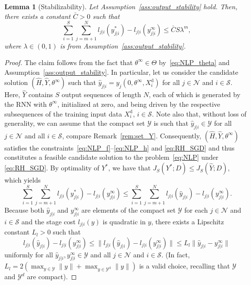 \documentclass{article} %
\newtheorem{lem}{Lemma}
\begin{document}
\begin{lem}[Stabilizability]\label{lem:controllability}
	Let Assumption~\ref{ass:output_stability} hold. Then, there exists a constant $\bar{C}>0$ such that
	\begin{equation}\label{eq:controllability}
		\sum_{i=1}^{S}\sum_{j=m+1}^{N}l_{j|i}({y}_{j|i}^*)-l_{j|i}({y}^\infty_{j|i}) \leq \bar{C}S\lambda^m,
	\end{equation}
	where $\lambda\in(0,1)$ is from Assumption~\ref{ass:output_stability}.
\end{lem}
\begin{proof}
	The claim follows from the fact that $\theta^\infty\in\Theta$ by~\eqref{eq:NLP_theta} and Assumption~\ref{ass:output_stability}. In particular, let us consider the candidate solution $(\hat{H},\hat{Y},\theta^\infty)$ such that $\hat{y}_{j|i} = y_j(0,\theta^\infty,X^\mathrm{d}_i)$ for all $j\in\mathcal{N}$ and $i\in\mathcal{S}$. Here, $\hat{Y}$ contains $S$ output sequences of length $N$, each of which is generated by the RNN with $\theta^\infty$, initialized at zero, and being driven by the respective subsequences of the training input data $X^\mathrm{d}_i$, $i\in\mathcal{S}$.
	Note also that, without loss of generality, we can assume that the compact set $\mathcal{Y}$ is such that $\hat{y}_{j|i}\in\mathcal{Y}$ for all $j\in\mathcal{N}$ and all $i\in\mathcal{S}$, compare Remark~\ref{rem:set_Y}.
	Consequently, $(\hat{H},\hat{Y},\theta^\infty)$ satisfies the constraints~\eqref{eq:NLP_f}--\eqref{eq:NLP_h} and \eqref{eq:RH_SGD} and thus constitutes a feasible candidate solution to the problem~\eqref{eq:NLP} under \eqref{eq:RH_SGD}. By optimality of $Y^*$, we have that $J_S(Y^*;D)\leq J_S(\hat{Y};D)$, which yields
	\begin{equation}\label{eq:proof_contr_1}
		\sum_{i=1}^{S}\sum_{j=m+1}^{N}l_{j|i}({y}^*_{j|i})-l_{j|i}({y}^\infty_{j|i}) \leq \sum_{i=1}^{S}\sum_{j=m+1}^{N}l_{j|i}(\hat{y}_{j|i})-l_{j|i}({y}^\infty_{j|i}).
	\end{equation}
	Because both ${\hat{y}_{j|i}}$ and ${y}^\infty_{j|i}$ are elements of the compact set $\mathcal{Y}$ for each $j\in\mathcal{N}$ and $i\in\mathcal{S}$ and the stage cost $l_{j|i}(y)$ is quadratic in $y$, there exists a Lipschitz constant $L_l>0$ such that
	\begin{equation}\label{eq:proof_contr_Lipschitz}
		l_{j|i}(\hat{y}_{j|i})-l_{j|i}({y}^\infty_{j|i}) \leq \|l_{j|i}(\hat{y}_{j|i})-l_{j|i}({y}^\infty_{j|i})\| \leq L_l\|\hat{y}_{j|i}-{y}^\infty_{j|i}\|
	\end{equation}
	uniformly for all $\hat{y}_{j|i},{y}^\infty_{j|i}\in\mathcal{Y}$ and all $j\in\mathcal{N}$ and $i\in\mathcal{S}$. (In fact, $L_l = 2(\max_{y\in\mathcal{Y}}\|y\| + \max_{y\in\mathcal{Y}^\mathrm{d}}\|y\|)$ is a valid choice, recalling that $\mathcal{Y}$ and $\mathcal{Y}^d$ are compact).

\end{proof}
\end{document}
